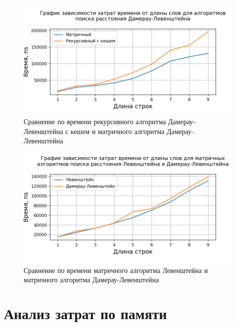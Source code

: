 \begin{figure}[H]
	\begin{center}
		\includegraphics[scale=0.7]{img/dam_lev_cache_vs_matrix.png}
	\end{center}
	\captionsetup{justification=centering}
	\caption{Сравнение по времени рекурсивного алгоритма Дамерау-Левенштейна с кешем и матричного алгоритма Дамерау-Левенштейна}
	\label{img:dam_lev_cache_vs_matrix}
\end{figure}

\begin{figure}[H]
	\begin{center}
		\includegraphics[scale=0.7]{img/lev_vs_dam.png}
	\end{center}
	\captionsetup{justification=centering}
	\caption{Сравнение по времени матричного алгоритма Левенштейна и матричного алгоритма Дамерау-Левенштейна}
	\label{img:lev_vs_dam}
\end{figure}

\section{Анализ затрат по памяти}

